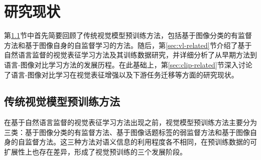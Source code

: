 \chapter{研究现状}
\label{cha:relate}
第\ref{sec:pt-related}节中首先简要回顾了传统视觉模型预训练方法，包括基于图像分类的有监督方法和基于图像自身的自监督学习的方法。随后，第\ref{sec:vl-related}节介绍了基于自然语言监督的视觉表征学习方法及其训练数据研究，并详细分析了从早期方法到语言-图像对比学习方法的发展历程。在此基础上，第\ref{sec:clip-related}节深入讨论了语言-图像对比学习在视觉表征增强以及下游任务迁移等方面的研究现状。


\section{传统视觉模型预训练方法}
\label{sec:pt-related}

在基于自然语言监督的视觉表征学习方法出现之前，视觉模型预训练方法主要分为三类：基于图像分类的有监督方法、基于图像话题标签的弱监督方法和基于图像自身的自监督方法。这三种方法对语义信息的利用程度各不相同，在预训练数据的可扩展性上也存在差异，形成了视觉预训练的三个发展阶段。 %


